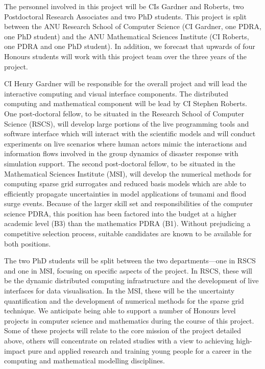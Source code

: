 \documentclass[a4paper,fontsize=12pt]{scrartcl}
\begin{document}
The personnel involved in this project will be CIs Gardner and
Roberts, two Postdoctoral Research Associates and two PhD students.
This project is split between the ANU Research School of Computer
Science (CI Gardner, one PDRA, one PhD student) and the ANU
Mathematical Sciences Institute (CI Roberts, one PDRA and one PhD
student). In addition, we forecast that upwards of four Honours
students will work with this project team over the three years of the
project.

CI Henry Gardner will be responsible for the overall project and will
lead the interactive computing and visual interface components. The
distributed computing and mathematical component will be lead by CI
Stephen Roberts. One post-doctoral fellow, to be situated in the
Research School of Computer Science (RSCS), will develop large
portions of the live programming tools and software interface which
will interact with the scientific models and will conduct experiments
on live scenarios where human actors mimic the interactions and
information flows involved in the group dynamics of disaster response
with simulation support. The second post-doctoral fellow, to be
situated in the Mathematical Sciences Institute (MSI), will develop
the numerical methods for computing sparse grid surrogates and reduced
basis models which are able to efficiently propagate uncertainties in
model applications of tsunami and flood surge events. Because of the
larger skill set and responsibilities of the computer science PDRA,
this position has been factored into the budget at a higher academic
level (B3) than the mathematics PDRA (B1). Without prejudicing a
competitive selection process, suitable candidates are known to be
available for both positions.

The two  PhD students will be split between the two departments---one
in RSCS and one in MSI, focusing on specific aspects of the project.
In RSCS, these will be the dynamic distributed computing
infrastructure and the development of live interfaces for data
visualisation. In the MSI, these will be the uncertainty
quantification and the development of numerical methods for the sparse
grid technique. We anticipate being able to support a number of Honours level projects in computer science and mathematics during the course of this project. Some of these projects will relate to the core mission of the project detailed above, others will concentrate on related studies with a view to achieving high-impact pure and applied research and training young people for a career in the computing and mathematical modelling disciplines.
\end{document}

